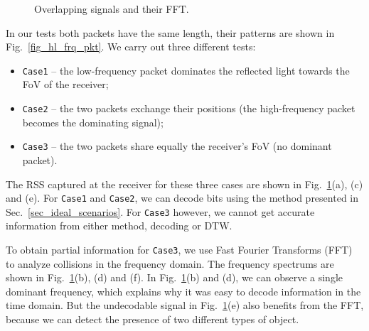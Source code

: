 \documentclass[10pt]{sig-alternate-05-2015}
\begin{document}
\def \width{0.49} 
\begin{figure}[!t]
	\hfill
	
	\hfill
	
	\hfill
	\vspace{-2mm}
	\caption {Overlapping signals and their FFT.}
	\vspace{-4mm}
	\label{fig_multi_tag}
\end{figure}

In our tests both packets have the same length, their patterns are shown in Fig.~\ref{fig_hl_frq_pkt}. We carry out three different tests: 
\begin{itemize}
	\item {\tt Case1} --
	the low-frequency packet dominates the reflected light towards the FoV of the receiver; 
	\item {\tt Case2} -- the two packets exchange their positions (the high-frequency packet becomes the dominating signal);
	\item {\tt Case3} -- the two packets share equally the receiver's FoV (no dominant packet).
\end{itemize}

The RSS captured at the receiver for these three cases are shown in Fig.~\ref{fig_multi_tag}(a), (c) and (e). For {\tt Case1} and {\tt Case2}, we can decode bits using the method presented in Sec.~\ref{sec_ideal_scenarios}. For {\tt Case3} however, we cannot get accurate information from either method, decoding or DTW.

To obtain partial information for {\tt Case3}, we use Fast Fourier Transforms (FFT) to analyze collisions in the frequency domain. The frequency spectrums are shown in Fig.~\ref{fig_multi_tag}(b), (d) and (f). In Fig.~\ref{fig_multi_tag}(b) and (d), we can observe a single dominant frequency, which explains why it was easy to decode information in the time domain. But the undecodable signal in Fig.~\ref{fig_multi_tag}(e) also benefits from the FFT, because we can detect the presence of two different types of object.
\end{document}
